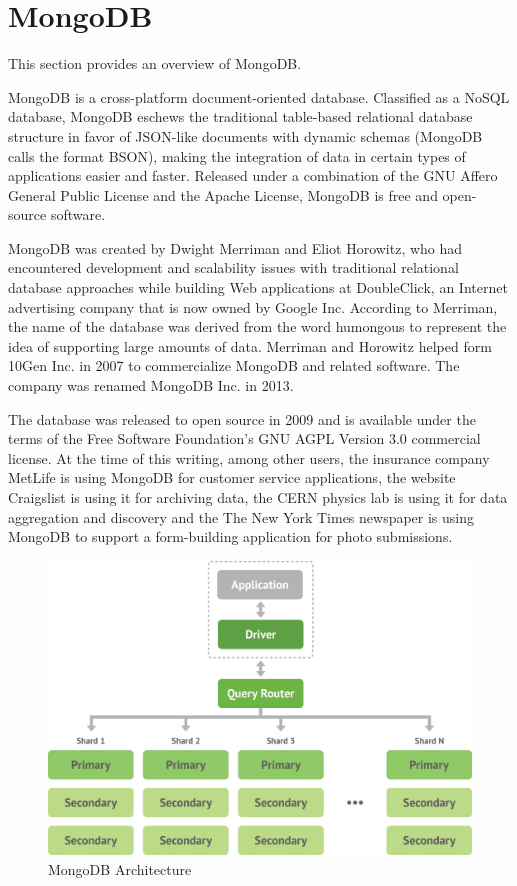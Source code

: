 \section{MongoDB}
\label{sec:TCH_mongodb}

This section provides an overview of MongoDB.

MongoDB is a cross-platform document-oriented database. Classified as a NoSQL database, 
MongoDB eschews the traditional table-based relational database structure in favor of JSON-like documents with dynamic schemas (MongoDB calls the format BSON), making the integration of data in certain types of applications easier and faster. Released under a combination of the GNU Affero General Public License and the Apache License, MongoDB is free and open-source software.

MongoDB was created by Dwight Merriman and Eliot Horowitz, who had encountered development and scalability issues with traditional relational database approaches while building Web applications at DoubleClick, an Internet advertising company that is now owned by Google Inc. According to Merriman, the name of the database was derived from the word humongous to represent the idea of supporting large amounts of data. Merriman and Horowitz helped form 10Gen Inc. in 2007 to commercialize MongoDB and related software. The company was renamed MongoDB Inc. in 2013. 

The database was released to open source in 2009 and is available under the terms of the Free Software Foundation's GNU AGPL Version 3.0 commercial license. At the time of this writing, among other users, the insurance company MetLife is using MongoDB for customer service applications, the website Craigslist is using it for archiving data, the CERN physics lab is using it for data aggregation and discovery and the The New York Times newspaper is using MongoDB to support a form-building application for photo submissions.


\begin {figure}[h]
\graphicspath{{images/chapter_TCH/}}
\includegraphics[width=\textwidth]{mongodb_1}
\caption{MongoDB Architecture}
\end {figure}